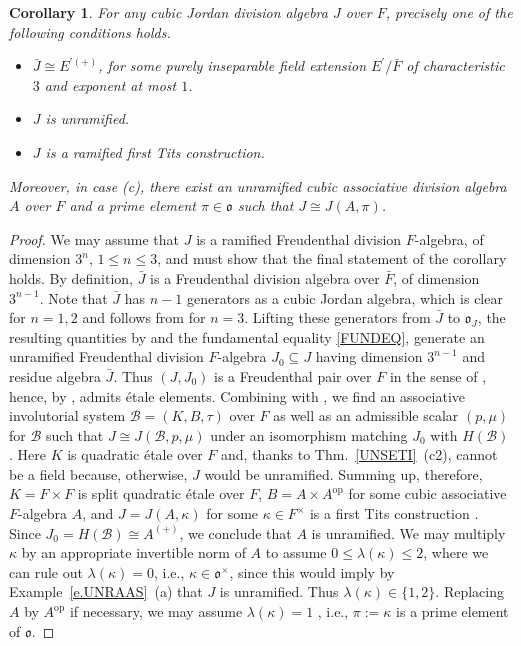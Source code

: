 \documentclass{amsart}
\newtheorem{cor}[equation]{Corollary}
\theoremstyle{definition} %
\theoremstyle{remark} %
\newcommand{\msB}{\mathscr{B}}
\newcommand{\mfo}{\mathfrak{o}}
\renewcommand{\:}{\colon\,}
\numberwithin{equation}{section}
\begin{document}
\begin{cor} \label{c.TRICHO}
For any cubic Jordan division algebra $J$ over $F$, precisely one of the following conditions holds.
\begin{itemize}
\item [(a)] $\bar J \cong E^{\prime(+)}$, for some purely inseparable field extension $E^\prime/\bar F$ of characteristic $3$ and exponent at most $1$.

\item [(b)] $J$ is unramified.

\item[(c)] $J$ is a ramified first Tits construction.
\end{itemize}
Moreover, in case (c), there exist an unramified cubic associative division algebra $A$ over $F$ and a prime element $\pi \in \mfo$ such that $J \cong J(A,\pi)$. 
\end{cor}

\begin{proof}
We may assume that $J$ is a ramified Freudenthal division $F$-algebra, of dimension $3^n$, $1 \leq n \leq 3$, and must show that the final statement of the corollary holds. By definition, $\bar J$ is a Freudenthal division algebra over $\bar F$, of dimension $3^{n-1}$. Note that $\bar J$ has $n - 1$ generators as a cubic Jordan algebra, which is clear for $n = 1,2$ and follows from \cite[Cor. of Lemma~9]{MR0379620} for $n = 3$. Lifting these generators from $\bar J$ to $\mfo_J$, the resulting quantities by \cite[Exc.~33.15]{MR4806163} and the fundamental equality \eqref{FUNDEQ}, generate an unramified Freudenthal division $F$-algebra $J_0 \subseteq J$ having dimension $3^{n-1}$ and residue algebra $\bar J$. Thus $(J,J_0)$ is a Freudenthal pair over $F$ in the sense of \cite[45.1]{MR4806163}, hence, by \cite[Thm.~45.10]{MR4806163}, admits \'etale elements. Combining \cite[Cor.~44.17]{MR4806163} with \cite[Lemma~A4.3]{garibaldi2025solutionsexercisesbookalbert}, we find an associative involutorial system $\msB= (K,B,\tau)$ over $F$ as well as an admissible scalar $(p,\mu)$ for $\msB$ such that $J \cong J(\msB,p,\mu)$ under an isomorphism matching $J_0$ with $H(\msB)$. Here $K$ is quadratic \'etale over $F$ \cite[Cor.~46.11]{MR4806163} and, thanks to Thm.~\ref{UNSETI}~(c2), cannot be a field because, otherwise, $J$ would be unramified. Summing up, therefore, $K =F \times F$ is split quadratic \'etale over $F$, $B =A \times A^{\mathrm{op}}$ for some cubic associative $F$-algebra $A$, and $J = J(A,\kappa)$ for some $\kappa \in F^\times$ is a first Tits construction \cite[Cor.~44.21]{MR4806163}. Since $J_0 = H(\msB) \cong A^{(+)}$, we conclude that $A$ is unramified. We may multiply $\kappa$ by an appropriate invertible norm of $A$ \cite[Exc.~42.22~(a)]{MR4806163} to assume $0 \le \lambda(\kappa) \le 2$, where we can rule out $\lambda(\kappa) = 0$, i.e., $\kappa \in \mfo^\times$, since this would imply by Example~\ref{e.UNRAAS}~(a) that $J$ is unramified. Thus $\lambda(\kappa) \in \{1,2\}$. Replacing $A$ by $A^{\mathrm{op}}$ if necessary, we may assume $\lambda(\kappa) = 1$ \cite[Exc.~42.22~(c), (d)]{MR4806163}, i.e., $\pi := \kappa$ is a prime element of $\mfo$.
\end{proof}
\end{document}
